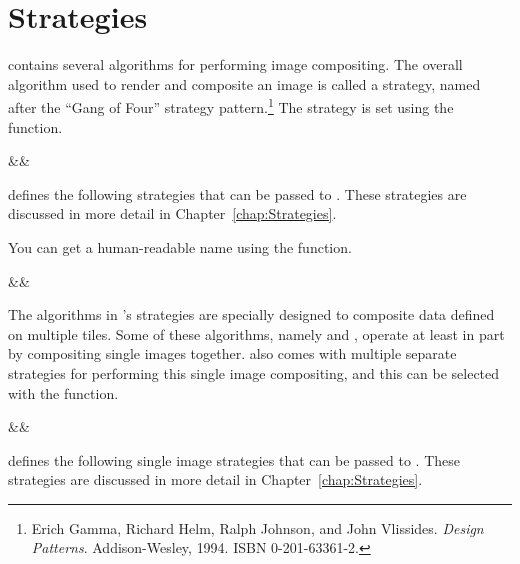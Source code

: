

\section{Strategies}
\label{sec:Basic_Usage:Strategies}


\IceT contains several algorithms for performing image compositing.  The
overall algorithm used to render and composite an image is called a
strategy, named after the ``Gang of Four'' strategy pattern.\footnote{Erich
  Gamma, Richard Helm, Ralph Johnson, and John Vlissides.  \emph{Design
    Patterns}.  Addison-Wesley, 1994.  ISBN 0-201-63361-2.}  The strategy
is set using the  function.

\begin{Table}{3}
  \textC{(}&&\quad\textC{);}
\end{Table}

\IceT defines the following strategies that can be passed to
.  These strategies are discussed in more detail in
Chapter~\ref{chap:Strategies}.



You can get a human-readable name using the 
function.

\begin{Table}{3}
  \textC{(}&&\textC{);}
\end{Table}

The algorithms in \IceT's strategies are specially designed to composite
data defined on multiple tiles.  Some of these algorithms, namely
 and ,
operate at least in part by compositing single images together.  \IceT also
comes with multiple separate strategies for performing this single image
compositing, and this can be selected with the
 function.

\begin{Table}{3}
  \textC{(}&&\quad\textC{);}
\end{Table}

\IceT defines the following single image strategies that can be passed to
.  These strategies are discussed in more
detail in Chapter~\ref{chap:Strategies}.

